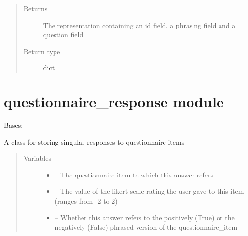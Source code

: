 \documentclass[letterpaper,10pt,english]{sphinxmanual}
\begin{document}
\begin{fulllineitems}
\begin{fulllineitems}
\begin{quote}
\begin{description}
\item[{Returns}] \leavevmode
The representation containing an id field, a phrasing field and a question field

\item[{Return type}] \leavevmode
\href{https://docs.python.org/2/library/stdtypes.html\#dict}{dict}

\end{description}\end{quote}

\end{fulllineitems}


\end{fulllineitems}



\section{questionnaire\_response module}
\label{\detokenize{questionnaire_response:questionnaire-response-module}}\label{\detokenize{questionnaire_response:module-questionnaire_response}}\label{\detokenize{questionnaire_response::doc}}

\begin{fulllineitems}
\label{\detokenize{questionnaire_response:questionnaire_response.QuestionnaireResponse}}
Bases: 

A class for storing singular responses to questionnaire items
\begin{quote}\begin{description}
\item[{Variables}] \leavevmode\begin{itemize}
\item {} 
{\hyperref[\detokenize{questionnaire_item:module-questionnaire_item}]{}} -- The questionnaire item to which this answer refers

\item {} 
 -- The value of the likert-scale rating the user gave to this item (ranges from -2 to 2)

\item {} 
 -- Whether this answer refers to the positively (True) or the negatively (False) phrased version of the questionnaire\_item

\end{itemize}

\end{description}\end{quote}

\end{fulllineitems}
\end{document}
